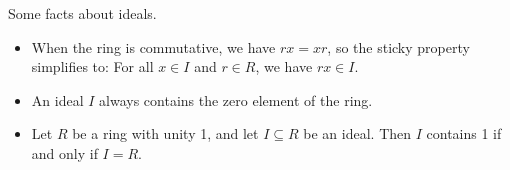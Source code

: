 \begin{facts}
	Some facts about ideals.
	\begin{itemize}
		\item When the ring is commutative, we have $rx = xr$, so the sticky
			property simplifies to: For all $x \in I$ and $r \in R$, we have $rx \in
			I$.
		\item An ideal $I$ always contains the zero element of the ring.
		\item Let $R$ be a ring with unity 1, and let $I \subseteq R$ be an ideal.
			Then $I$ contains 1 if and only if $I = R$.
	\end{itemize}
\end{facts}
